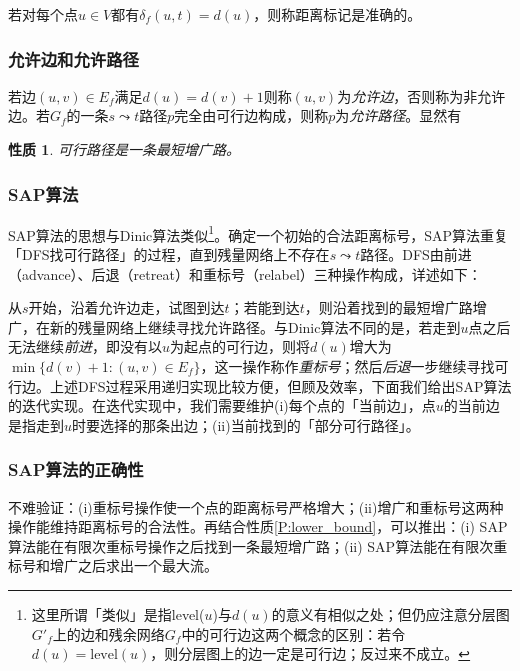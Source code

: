\documentclass[a4paper]{ctexbook}
\newtheorem{property}{性质}[chapter]
\begin{document}
  若对每个点$u\in V$都有$\delta_f(u,t)=d(u)$，则称距离标记是准确的。
  \subsubsection*{允许边和允许路径}
  若边$(u,v)\in E_f$满足$d(u)=d(v)+1$则称$(u,v)$为\emph{允许边}，否则称为非允许边。若$G_f$的一条$s\leadsto t$路径$p$完全由可行边构成，则称$p$为\emph{允许路径}。显然有
  \begin{property}
    可行路径是一条最短增广路。
  \end{property}

  \subsubsection*{SAP算法}
  SAP算法的思想与Dinic算法类似\footnote{这里所谓「类似」是指level($u$)与$d(u)$的意义有相似之处；但仍应注意分层图$G'_f$上的边和残余网络$G_f$中的可行边这两个概念的区别：若令$d(u)=\mathrm{level}(u)$，则分层图上的边一定是可行边；反过来不成立。}。确定一个初始的合法距离标号，SAP算法重复「DFS找可行路径」的过程，直到残量网络上不存在$s\leadsto t$路径。DFS由前进（advance）、后退（retreat）和重标号（relabel）三种操作构成，详述如下：

  从$s$开始，沿着允许边走，试图到达$t$；若能到达$t$，则沿着找到的最短增广路增广，在新的残量网络上继续寻找允许路径。与Dinic算法不同的是，若走到$u$点之后无法继续\emph{前进}，即没有以$u$为起点的可行边，则将$d(u)$增大为$\min\{d(v)+1\colon (u,v)\in E_f\}$，这一操作称作\emph{重标号}；然后\emph{后退}一步继续寻找可行边。上述DFS过程采用递归实现比较方便，但顾及效率，下面我们给出SAP算法的迭代实现。在迭代实现中，我们需要维护(i)每个点的「当前边」，点$u$的当前边是指走到$u$时要选择的那条出边；(ii)当前找到的「部分可行路径」。
  
  \subsubsection{SAP算法的正确性}
  不难验证：(i)重标号操作使一个点的距离标号严格增大；(ii)增广和重标号这两种操作能维持距离标号的合法性。再结合性质\ref{P:lower_bound}，可以推出：(i) SAP算法能在有限次重标号操作之后找到一条最短增广路；(ii) SAP算法能在有限次重标号和增广之后求出一个最大流。
\end{document}
